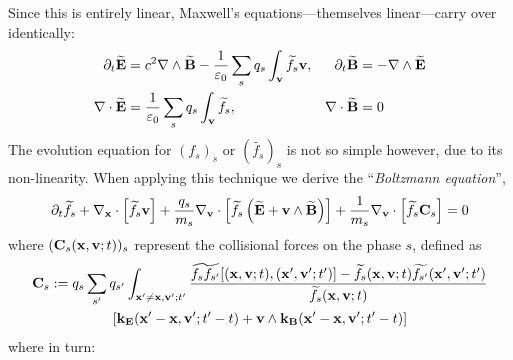     Since this is entirely linear, Maxwell's equations—themselves linear—carry over identically:
    \begin{align*}
        \partial_{t}\widetilde{\mathbf{E}}  &=  c^{2}\nabla\wedge\widetilde{\mathbf{B}} - \frac{1}{\varepsilon_{0}}\sum_{s}q_{s}\int_{\mathbf{v}}\widetilde{f_{s}}\mathbf{v},  &
        \partial_{t}\widetilde{\mathbf{B}}  &=  - \nabla\wedge\widetilde{\mathbf{E}}  \\
        \nabla\cdot\widetilde{\mathbf{E}}  &=  \frac{1}{\varepsilon_{0}}\sum_{s}q_{s}\int_{\mathbf{v}}\widetilde{f_{s}},  &
        \nabla\cdot\widetilde{\mathbf{B}}  &=  0
    \end{align*}
    The evolution equation for $(f_{s})_{s}$ or $\left(\widetilde{f_{s}}\right)_{s}$ is not so simple however, due to its non-linearity. When applying this technique we derive the ``\emph{Boltzmann equation}'', \BA{[Ref]}
    \begin{equation}\label{eqn:Boltzmann equation}
        \partial_{t}\widetilde{f_{s}} + \nabla_{\mathbf{x}}\cdot\left[\widetilde{f_{s}}\mathbf{v}\right] + \frac{q_{s}}{m_{s}}\nabla_{\mathbf{v}}\cdot\left[\widetilde{f_{s}}\left(\widetilde{\mathbf{E}} + \mathbf{v}\wedge\widetilde{\mathbf{B}}\right)\right] + \frac{1}{m_{s}}\nabla_{\mathbf{v}}\cdot\left[\widetilde{f_{s}}\mathbf{C}_{s}\right]  =  0
    \end{equation}
    where $(\mathbf{C}_{s}(\mathbf{x}, \mathbf{v}; t))_{s}$ represent the collisional forces on the phase $s$, defined as
    \begin{multline}
        \bfC_{s}  :=  q_{s}\sum_{s'}q_{s'}\int_{\bfx' \neq \bfx, \bfv'; t'}\frac{\widetilde{f_{s}f_{s'}}[(\bfx, \bfv; t), (\bfx', \bfv'; t')] - \widetilde{f_{s}}(\bfx, \bfv; t)\widetilde{f_{s'}}(\bfx', \bfv'; t')}{\widetilde{f_{s}}(\bfx, \bfv; t)}  \\
        [\bfk_{\bfE}(\bfx' - \bfx, \bfv'; t' - t) + \bfv\wedge\bfk_{\bfB}(\bfx' - \bfx, \bfv'; t' - t)]
    \end{multline}
    where in turn:
